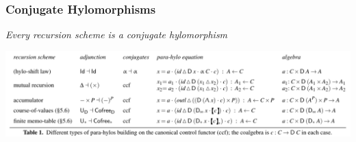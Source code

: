 % 
% 



\begin{frame}[fragile]
  \frametitle{Conjugate Hylomorphisms}
  \centering
  {\Large\emph{Every recursion scheme is a conjugate hylomorphism}}%

  \vspace{.4cm}

  \begin{sticky}\includegraphics[width=\textwidth]{figures/types-of-parahylos-crop.pdf}\end{sticky}
\end{frame}

